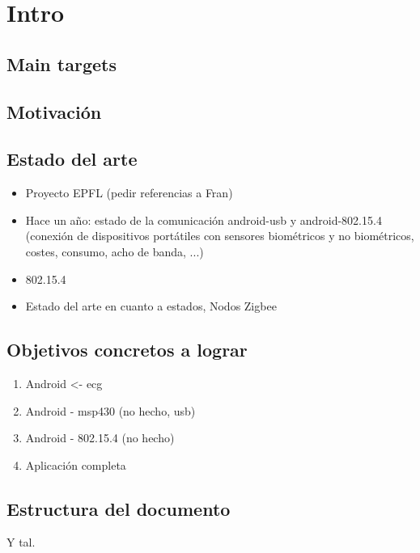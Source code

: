 \chapter{Intro}
\label{cha:intro}
	\section{Main targets}
	
		\section{Motivación}
		\section{Estado del arte}
			\begin{itemize}
				\item Proyecto EPFL (pedir referencias a Fran)
				\item Hace un año: estado de la comunicación android-usb y android-802.15.4 (conexión de dispositivos portátiles con sensores biométricos y no biométricos, costes, consumo, acho de banda, ...)
				\item 802.15.4
				\item Estado del arte en cuanto a estados, Nodos Zigbee
			\end{itemize}
		\section{Objetivos concretos a lograr}
			\begin{enumerate}
				\item Android <- ecg
				\item Android - msp430 (no hecho, usb)
				\item Android - 802.15.4 (no hecho)
				\item Aplicación completa
			\end{enumerate}
		\section{Estructura del documento}
			Y tal.
		
		


